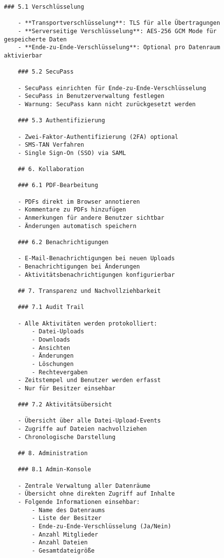 \begin{Verbatim}[breaklines=true]
    ### 5.1 Verschlüsselung
    
    - **Transportverschlüsselung**: TLS für alle Übertragungen
    - **Serverseitige Verschlüsselung**: AES-256 GCM Mode für gespeicherte Daten
    - **Ende-zu-Ende-Verschlüsselung**: Optional pro Datenraum aktivierbar
    
    ### 5.2 SecuPass
    
    - SecuPass einrichten für Ende-zu-Ende-Verschlüsselung
    - SecuPass in Benutzerverwaltung festlegen
    - Warnung: SecuPass kann nicht zurückgesetzt werden
    
    ### 5.3 Authentifizierung
    
    - Zwei-Faktor-Authentifizierung (2FA) optional
    - SMS-TAN Verfahren
    - Single Sign-On (SSO) via SAML
    
    ## 6. Kollaboration
    
    ### 6.1 PDF-Bearbeitung
    
    - PDFs direkt im Browser annotieren
    - Kommentare zu PDFs hinzufügen
    - Anmerkungen für andere Benutzer sichtbar
    - Änderungen automatisch speichern
    
    ### 6.2 Benachrichtigungen
    
    - E-Mail-Benachrichtigungen bei neuen Uploads
    - Benachrichtigungen bei Änderungen
    - Aktivitätsbenachrichtigungen konfigurierbar
    
    ## 7. Transparenz und Nachvollziehbarkeit
    
    ### 7.1 Audit Trail
    
    - Alle Aktivitäten werden protokolliert:
        - Datei-Uploads
        - Downloads
        - Ansichten
        - Änderungen
        - Löschungen
        - Rechtevergaben
    - Zeitstempel und Benutzer werden erfasst
    - Nur für Besitzer einsehbar
    
    ### 7.2 Aktivitätsübersicht
    
    - Übersicht über alle Datei-Upload-Events
    - Zugriffe auf Dateien nachvollziehen
    - Chronologische Darstellung
    
    ## 8. Administration
    
    ### 8.1 Admin-Konsole
    
    - Zentrale Verwaltung aller Datenräume
    - Übersicht ohne direkten Zugriff auf Inhalte
    - Folgende Informationen einsehbar:
        - Name des Datenraums
        - Liste der Besitzer
        - Ende-zu-Ende-Verschlüsselung (Ja/Nein)
        - Anzahl Mitglieder
        - Anzahl Dateien
        - Gesamtdateigröße
    

\end{Verbatim}
